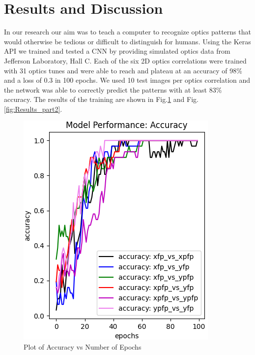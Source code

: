 \documentclass[conference]{IEEEtran}
\begin{document}
\section{Results and Discussion}

\indent In our research our aim was to teach a computer to recognize optics patterns that would otherwise be tedious or difficult to distinguish for humans. Using the Keras API we trained and tested a CNN by providing simulated optics data from Jefferson Laboratory, Hall C. Each of the six 2D optics correlations were trained with 31 optics tunes and were able to reach and plateau at an accuracy of 98\% and a loss of 0.3 in 100 epochs. We used 10 test images per optics correlation and the network was able to correctly predict the patterns with at least 83\% accuracy. The results of the training are shown in Fig.\ref{fig:Results_part1} and Fig.\ref{fig:Results_part2}. 

\begin{figure}[ht!]
  \centering
  \includegraphics[scale=0.6]{images/Results_part1.png}
  \caption{Plot of Accuracy vs Number of Epochs}
  \label{fig:Results_part1}
\end{figure}
\end{document}
